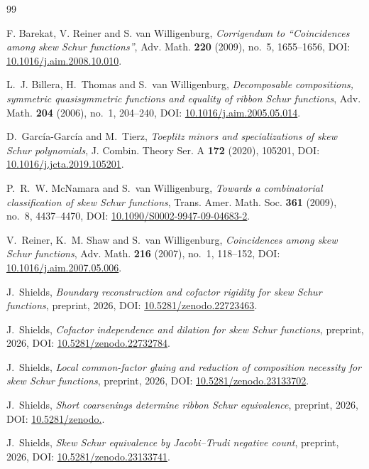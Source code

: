 \documentclass[11pt,a4paper]{amsart}
\numberwithin{equation}{section}
\theoremstyle{plain}
\theoremstyle{definition}
\begin{document}
\begin{thebibliography}{99}

F. Barekat, V. Reiner and S. van Willigenburg,
\emph{Corrigendum to ``Coincidences among skew Schur functions''},
Adv. Math. \textbf{220} (2009), no.~5, 1655--1656,
DOI: \href{https://doi.org/10.1016/j.aim.2008.10.010}{10.1016/\allowbreak j.aim.2008.10.010}.

L.~J. Billera, H.~Thomas and S.~van Willigenburg,
\emph{Decomposable compositions, symmetric quasisymmetric functions and equality of ribbon Schur functions},
Adv. Math. \textbf{204} (2006), no.~1, 204--240,
DOI: \href{https://doi.org/10.1016/j.aim.2005.05.014}{10.1016/\allowbreak j.aim.2005.05.014}.

D.~Garc\'ia-Garc\'ia and M.~Tierz,
\emph{Toeplitz minors and specializations of skew Schur polynomials},
J. Combin. Theory Ser. A \textbf{172} (2020), 105201,
DOI: \href{https://doi.org/10.1016/j.jcta.2019.105201}{10.1016/\allowbreak j.jcta.2019.105201}.

P.~R.~W. McNamara and S.~van Willigenburg,
\emph{Towards a combinatorial classification of skew Schur functions},
Trans. Amer. Math. Soc. \textbf{361} (2009), no.~8, 4437--4470,
DOI: \href{https://doi.org/10.1090/S0002-9947-09-04683-2}{10.1090/\allowbreak S0002-9947-09-04683-2}.

V.~Reiner, K.~M. Shaw and S.~van Willigenburg,
\emph{Coincidences among skew Schur functions},
Adv. Math. \textbf{216} (2007), no.~1, 118--152,
DOI: \href{https://doi.org/10.1016/j.aim.2007.05.006}{10.1016/\allowbreak j.aim.2007.05.006}.

J.~Shields,
\emph{Boundary reconstruction and cofactor rigidity for skew Schur functions},
preprint, 2026,
DOI: \href{https://doi.org/10.5281/zenodo.22723463}{10.5281/\allowbreak zenodo.22723463}.

J.~Shields,
\emph{Cofactor independence and dilation for skew Schur functions},
preprint, 2026,
DOI: \href{https://doi.org/10.5281/zenodo.22732784}{10.5281/\allowbreak zenodo.22732784}.

J.~Shields,
\emph{Local common-factor gluing and reduction of composition necessity for skew Schur functions},
preprint, 2026,
DOI: \href{https://doi.org/10.5281/zenodo.23133702}{10.5281/\allowbreak zenodo.23133702}.

J.~Shields,
\emph{Short coarsenings determine ribbon Schur equivalence},
preprint, 2026,
DOI: \href{https://doi.org/10.5281/zenodo.23644543}{10.5281/\allowbreak zenodo.}.

J.~Shields,
\emph{Skew Schur equivalence by Jacobi--Trudi negative count},
preprint, 2026,
DOI: \href{https://doi.org/10.5281/zenodo.23133741}{10.5281/\allowbreak zenodo.23133741}.
\end{thebibliography}
\end{document}
